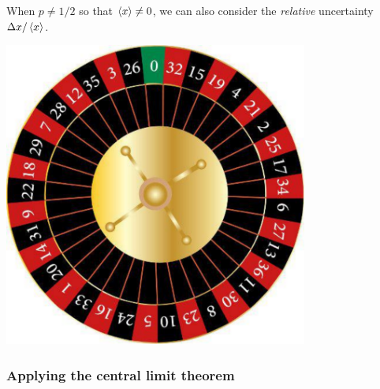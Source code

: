 When $p \neq 1 / 2$ so that $\left\langle x \right\rangle \ne 0$, we can also consider the \textit{relative} uncertainty $\Delta x / \left\langle x \right\rangle$.

\begin{minipage}{0.5\textwidth}
  \includegraphics[width=0.75\textwidth]{figs/roulette.pdf}
\end{minipage}%
\begin{minipage}{0.5\textwidth}
  
\end{minipage}



\subsubsection{Applying the central limit theorem}
